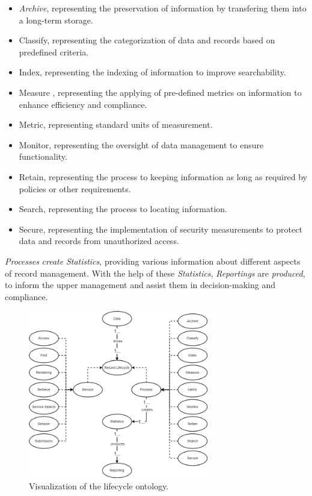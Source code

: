 \documentclass[
  a4paper,  %
  twoside,  %
  bibliography=totoc,
  headsepline,
  cleardoublepage=empty,
  parskip=half,
  draft=false
]{scrbook}
\begin{document}
\begin{itemize}
    \item \textit{Archive}, representing the preservation of information by transfering them into a long-term storage.
    \item Classify, representing the categorization of data and records based on predefined criteria.
    \item Index, representing the indexing of information to improve searchability. 
    \item Measure , representing the applying of pre-defined metrics on information to enhance efficiency and compliance. 
    \item Metric, representing standard units of measurement.
    \item Monitor, representing the oversight of data management to ensure functionality.
    \item Retain, representing the process to keeping information as long as required by policies or other requirements. 
    \item Search, representing the process to locating information.
    \item Secure, representing the implementation of security measurements to protect data and records from unauthorized access. 
\end{itemize}

\textit{Processes} \textit{create} \textit{Statistics}, providing various information about different aspects of record management. With the help of these \textit{Statistics}, \textit{Reportings} are \textit{produced}, to inform the upper management and assist them in  decision-making and compliance. 

\begin{figure}[h]
  \centering
  \includegraphics[width=0.7\textwidth]{graphics/lifecycle.drawio.png}
  \caption{Visualization of the lifecycle ontology.}
  \label{fig:lifecycle}
\end{figure}
\end{document}
